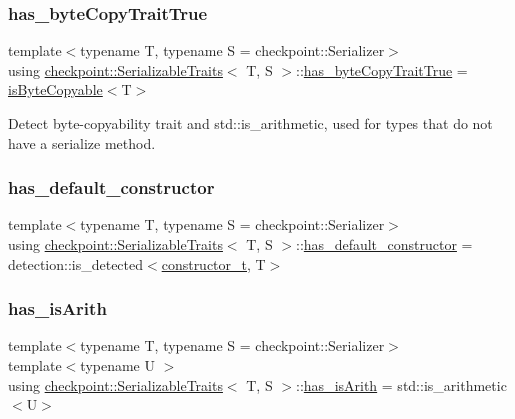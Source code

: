 \subsubsection{\texorpdfstring{has\+\_\+byte\+Copy\+Trait\+True}{has\_byteCopyTraitTrue}}
{\footnotesize\ttfamily template$<$typename T, typename S = checkpoint\+::\+Serializer$>$ \\
using \hyperlink{structcheckpoint_1_1_serializable_traits}{checkpoint\+::\+Serializable\+Traits}$<$ T, S $>$\+::\hyperlink{structcheckpoint_1_1_serializable_traits_a8e42305be1264b105f525ae7dff36c15}{has\+\_\+byte\+Copy\+Trait\+True} =  \hyperlink{structcheckpoint_1_1is_byte_copyable}{is\+Byte\+Copyable}$<$T$>$}

Detect byte-\/copyability trait and std\+::is\+\_\+arithmetic, used for types that do not have a serialize method. \mbox{\label{structcheckpoint_1_1_serializable_traits_a824afd2953233388cbc3223a82c75df8}} 
\subsubsection{\texorpdfstring{has\+\_\+default\+\_\+constructor}{has\_default\_constructor}}
{\footnotesize\ttfamily template$<$typename T, typename S = checkpoint\+::\+Serializer$>$ \\
using \hyperlink{structcheckpoint_1_1_serializable_traits}{checkpoint\+::\+Serializable\+Traits}$<$ T, S $>$\+::\hyperlink{structcheckpoint_1_1_serializable_traits_a824afd2953233388cbc3223a82c75df8}{has\+\_\+default\+\_\+constructor} =  detection\+::is\+\_\+detected$<$\hyperlink{structcheckpoint_1_1_serializable_traits_aa0430155930461d346b90681db234d84}{constructor\+\_\+t}, T$>$}

\mbox{\label{structcheckpoint_1_1_serializable_traits_a8a8b20be974e219f4fb39b4346be0536}} 
\subsubsection{\texorpdfstring{has\+\_\+is\+Arith}{has\_isArith}}
{\footnotesize\ttfamily template$<$typename T, typename S = checkpoint\+::\+Serializer$>$ \\
template$<$typename U $>$ \\
using \hyperlink{structcheckpoint_1_1_serializable_traits}{checkpoint\+::\+Serializable\+Traits}$<$ T, S $>$\+::\hyperlink{structcheckpoint_1_1_serializable_traits_a8a8b20be974e219f4fb39b4346be0536}{has\+\_\+is\+Arith} =  std\+::is\+\_\+arithmetic$<$U$>$}

